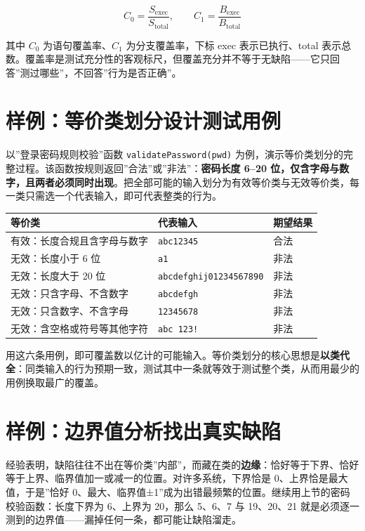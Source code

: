 \documentclass[
]{ctexbook}
\newcounter{none}
\begin{document}
\[C_0=\frac{S_{\mathrm{exec}}}{S_{\mathrm{total}}},\qquad C_1=\frac{B_{\mathrm{exec}}}{B_{\mathrm{total}}}\]

其中 \(C_0\) 为语句覆盖率、\(C_1\) 为分支覆盖率，下标 exec
表示已执行、total
表示总数。覆盖率是测试充分性的客观标尺，但覆盖充分并不等于无缺陷------它只回答''测过哪些''，不回答''行为是否正确''。

\section{样例：等价类划分设计测试用例}\label{ux6837ux4f8bux7b49ux4ef7ux7c7bux5212ux5206ux8bbeux8ba1ux6d4bux8bd5ux7528ux4f8b}

以''登录密码规则校验''函数 \texttt{validatePassword(pwd)}
为例，演示等价类划分的完整过程。该函数按规则返回''合法''或''非法''：\textbf{密码长度
6--20
位，仅含字母与数字，且两者必须同时出现}。把全部可能的输入划分为有效等价类与无效等价类，每一类只需选一个代表输入，即可代表整类的行为。

{\def\LTcaptype{none} %
\begin{longtable}[]{@{}lll@{}}
\toprule\noalign{}
等价类 & 代表输入 & 期望结果 \\
\midrule\noalign{}
\endhead
\bottomrule\noalign{}
\endlastfoot
有效：长度合规且含字母与数字 & \texttt{abc12345} & 合法 \\
无效：长度小于 6 位 & \texttt{a1} & 非法 \\
无效：长度大于 20 位 & \texttt{abcdefghij01234567890} & 非法 \\
无效：只含字母、不含数字 & \texttt{abcdefgh} & 非法 \\
无效：只含数字、不含字母 & \texttt{12345678} & 非法 \\
无效：含空格或符号等其他字符 & \texttt{abc\ 123!} & 非法 \\
\end{longtable}
}

用这六条用例，即可覆盖数以亿计的可能输入。等价类划分的核心思想是\textbf{以类代全}：同类输入的行为预期一致，测试其中一条就等效于测试整个类，从而用最少的用例换取最广的覆盖。

\section{样例：边界值分析找出真实缺陷}\label{ux6837ux4f8bux8fb9ux754cux503cux5206ux6790ux627eux51faux771fux5b9eux7f3aux9677}

经验表明，缺陷往往不出在等价类''内部''，而藏在类的\textbf{边缘}：恰好等于下界、恰好等于上界、临界值加一或减一的位置。对许多系统，下界恰是
0、上界恰是最大值，于是''恰好
0、最大、临界值±1''成为出错最频繁的位置。继续用上节的密码校验函数：长度下界为
6、上界为 20，那么 5、6、7 与 19、20、21
就是必须逐一测到的边界值------漏掉任何一条，都可能让缺陷溜走。
\end{document}
